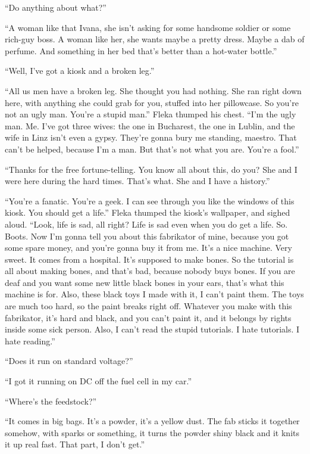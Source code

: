 \documentclass[20 pt,twoside,extrafontsizes,final]{memoir}
\begin{document}
``Do anything about what?''

``A woman like that Ivana, she isn't asking for some handsome soldier or some rich-guy boss. A woman like her, she wants maybe a pretty dress. Maybe a dab of perfume. And something in her bed that's better than a hot-water bottle.''

``Well, I've got a kiosk and a broken leg.''

``All us men have a broken leg. She thought you had nothing. She ran right down here, with anything she could grab for you, stuffed into her pillowcase. So you're not an ugly man. You're a stupid man.'' Fleka thumped his chest. ``I'm the ugly man. Me. I've got three wives: the one in Bucharest, the one in Lublin, and the wife in Linz isn't even a gypsy. They're gonna bury me standing, maestro. That can't be helped, because I'm a man. But that's not what you are. You're a fool.''

``Thanks for the free fortune-telling. You know all about this, do you? She and I were here during the hard times. That's what. She and I have a history.''

``You're a fanatic. You're a geek. I can see through you like the windows of this kiosk. You should get a life.'' Fleka thumped the kiosk's wallpaper, and sighed aloud. ``Look, life is sad, all right? Life is sad even when you do get a life. So. Boots. Now I'm gonna tell you about this fabrikator of mine, because you got some spare money, and you're gonna buy it from me. It's a nice machine. Very sweet. It comes from a hospital. It's supposed to make bones. So the tutorial is all about making bones, and that's bad, because nobody buys bones. If you are deaf and you want some new little black bones in your ears, that's what this machine is for. Also, these black toys I made with it, I can't paint them. The toys are much too hard, so the paint breaks right off. Whatever you make with this fabrikator, it's hard and black, and you can't paint it, and it belongs by rights inside some sick person. Also, I can't read the stupid tutorials. I hate tutorials. I hate reading.''

``Does it run on standard voltage?''

``I got it running on DC off the fuel cell in my car.''

``Where's the feedstock?''

``It comes in big bags. It's a powder, it's a yellow dust. The fab sticks it together somehow, with sparks or something, it turns the powder shiny black and it knits it up real fast. That part, I don't get.''
\end{document}
